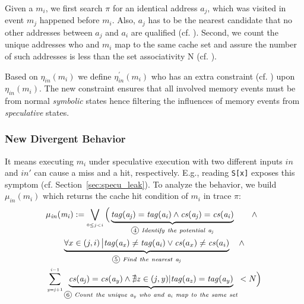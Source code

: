 \documentclass[sigconf]{acmart}
\newcommand*\circled[1]{\tikz[baseline=(char.base)]{
				\node[shape=circle,draw,inner sep=1pt] (char) {\scriptsize{#1}};}}
\begin{document}
Given a $\mathit{m_i}$, we first search $\pi$ for an identical address 
$\mathit{a_j}$, which was visited in event $\mathit{m_j}$ happened before 
$\mathit{m_i}$. Also, $\mathit{a_j}$ has to be the nearest candidate that 
no other addresses between $\mathit{a_j}$ and $\mathit{a_i}$ are qualified
(cf. \circled{1}). Second, we count the unique addresses who and $\mathit{m_i}$
map to the same cache set and assure the number of such addresses is less 
than the set associativity N (cf. \circled{2}).
%

Based on $\mathit{\eta_{in}(m_i)}$ we define $\mathit{\eta^\prime_{in}(m_i)}$
who has an extra constraint (cf. \circled{3}) upon $\mathit{\eta_{in}(m_i)}$. 
The new constraint ensures that all involved memory events must be from 
normal \textit{symbolic} states hence filtering the influences of memory 
events from \textit{speculative} states.

\subsubsection{New Divergent Behavior}
\label{sec:new_div}
It means executing $\mathit{m_i}$ under speculative execution with two different
inputs $\mathit{in}$ and $\mathit{in'}$ can cause a miss and a hit, respectively. 
E.g., reading \texttt{S[x]} exposes this symptom (cf. Section~\ref{sec:specu_leak}). 
To analyze the behavior, we build $\mathit{\mu_{in}(m_i)}$ which returns the cache
hit condition of $\mathit{m_i}$ in trace $\pi$:
%
%
\begin{multline}
  \label{eqn:hc}
    \mathit{\mu_{in}(m_i)}:=
    \bigvee_{{\scriptscriptstyle 0{\leq}j<i}}
    \Big(
    \underbrace{
      \mathit{tag(a_j)}=\mathit{tag(a_i)} 
			\wedge 
      \mathit{cs(a_j)}=\mathit{cs(a_i)} 
    }_{{\circled{4}}\mathit{~Identify~the~potential~a_j}}
    ~~~~~~\wedge 
		~~\\
    \underbrace{
      {\forall}x\in\left(j,i\right)\big |\mathit{tag(a_x)}\ne\mathit{tag(a_i)}
      \vee 
      \mathit{cs}(a_x)\ne\mathit{cs}(a_i)
    }_{{\circled{5}}\mathit{~Find~the~nearest~a_j}}
		~~~\wedge 
		\\
    \sum_{{\scriptscriptstyle \mathit{y=j}+1}}^{{\scriptscriptstyle \mathit{i-}1}} 
    \underbrace{
      \mathit{cs(a_j)}=\mathit{cs(a_y)} 
      \wedge
      \nexists\mathit{z}\in(\mathit{j,y})|\mathit{tag(a_z)}=\mathit{tag(a_y)}
    }_{{\circled{6}}\mathit{~Count~the~unique~a_y~who~and~a_i~map~to~the~same~set}}
    <N 
    \Big)
\end{multline}
\vspace{.8ex}
%
%
\end{document}
